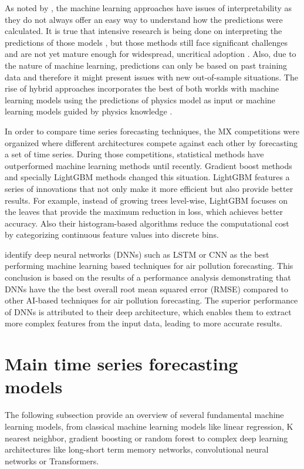 \documentclass[12pt,a4paper]{book}
\begin{document}
As noted by \citet{gardner-frolick_selecting_2022}, the machine learning approaches have issues of interpretability as they do not always offer an easy way to understand how the predictions were calculated. It is true that intensive research is being done on interpreting the predictions of those models \citep{vega_garcia_shapley_2020}, but those methods still face significant challenges and are not yet mature enough for widespread, uncritical adoption \citep{Silva2024, rudin_stop_2019}. Also, due to the nature of machine learning, predictions can only be based on past training data and therefore it might present issues with new out-of-sample situations. The rise of hybrid approaches incorporates the best of both worlds with machine learning models using the predictions of physics model as input \citep[e.g. ][]{de_medrano_socaire_2021} or machine learning models guided by physics knowledge \citep[e.g. ][]{hettige_airphynet:_2024}.

In order to compare time series forecasting techniques, the MX competitions \citep[e.g. ][]{makridakis_m3-competition:_2000,makridakis_m4_2020,makridakis_m5_2022} were organized where different architectures compete against each other by forecasting a set of time series. During those competitions, statistical methods have outperformed machine learning methods until recently. Gradient boost methods and specially LightGBM \citep{NIPS2017_6449f44a} methods changed this situation. LightGBM features a series of innovations that not only make it more efficient but also provide better results. For example, instead of growing trees level-wise, LightGBM focuses on the leaves that provide the maximum reduction in loss, which achieves better accuracy. Also their histogram-based algorithms reduce the computational cost by categorizing continuous feature values into discrete bins.

\citet{masood_review_2021} identify deep neural networks (DNNs) such as LSTM or CNN as the best performing machine learning based techniques for air pollution forecasting. This conclusion is based on the results of a performance analysis demonstrating that DNNs have the the best overall root mean squared error (RMSE) compared to other AI-based techniques for air pollution forecasting. The superior performance of DNNs is attributed to their deep architecture, which enables them to extract more complex features from the input data, leading to more accurate results.

\section{Main time series forecasting models}
The following subsection provide an overview of several fundamental machine learning models, from classical machine learning models like linear regression, K nearest neighbor, gradient boosting or random forest to complex deep learning architectures like long-short term memory networks, convolutional neural networks or Transformers.
\end{document}
